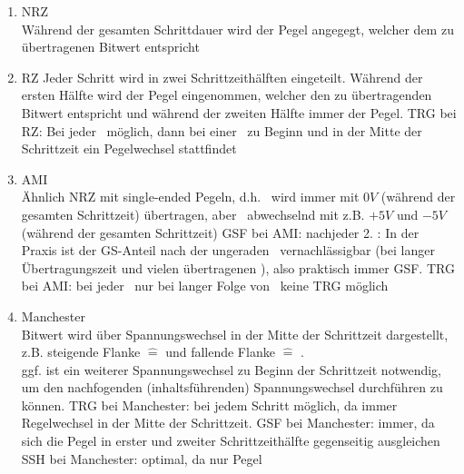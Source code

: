 \documentclass[10pt,a4paper]{scrartcl}
\begin{document}
\begin{enumerate}
	\item \ac{NRZ}\\
		Während der gesamten Schrittdauer wird der Pegel angegegt, welcher dem zu übertragenen Bitwert entspricht
	\item \ac{RZ}
		Jeder Schritt wird in zwei Schrittzeithälften eingeteilt. Während der ersten Hälfte wird der Pegel eingenommen, welcher den zu übertragenden Bitwert entspricht und während der zweiten Hälfte immer der \grqq\-Pegel.
		\subitem \ac{TRG} bei \ac{RZ}: Bei jeder \grqq\ möglich, dann bei einer \grqq\ zu Beginn und in der Mitte der Schrittzeit ein Pegelwechsel stattfindet
	\item \ac{AMI}\\
		Ähnlich \ac{NRZ} mit single-ended Pegeln, d.h. \grqq\ wird immer mit $0V$ (während der gesamten Schrittzeit) übertragen, aber \grqq\ abwechselnd mit z.B. $+5V$ und $-5V$ (während der gesamten Schrittzeit)
		\subitem \ac{GSF} bei \ac{AMI}: nachjeder 2. \grqq: In der Praxis ist der GS-Anteil nach der ungeraden \grqq\ vernachlässigbar (bei langer Übertragungszeit und vielen übertragenen \grqq), also praktisch immer \ac{GSF}.
		\subitem \ac{TRG} bei \ac{AMI}: bei jeder \grqq\ nur bei langer Folge von \grqq\ keine \ac{TRG} möglich
	\item Manchester\\
		Bitwert wird über Spannungswechsel in der Mitte der Schrittzeit dargestellt, z.B. steigende Flanke $\hat{=}$ \grqq und fallende Flanke $\hat{=}$  \grqq.\\
		ggf. ist ein weiterer Spannungswechsel zu Beginn der Schrittzeit notwendig, um den nachfogenden (inhaltsführenden) Spannungswechsel durchführen zu können.
		\subitem \ac{TRG} bei Manchester: bei jedem Schritt möglich, da immer Regelwechsel in der Mitte der Schrittzeit.
		\subitem \ac{GSF} bei Manchester: immer, da sich die Pegel in erster und zweiter Schrittzeithälfte gegenseitig ausgleichen
		\subitem \ac{SSH} bei Manchester: optimal, da \glqq nur  Pegel
\end{enumerate}
\end{document}

